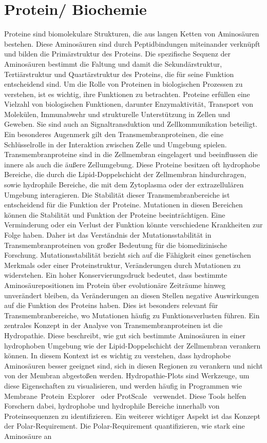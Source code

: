 \documentclass[german,version-2022-01]{uzl-thesis}
\begin{document}
\section{Protein/ Biochemie}
Proteine sind biomolekulare Strukturen, die aus langen Ketten von Aminos\"auren bestehen. Diese Aminos\"auren sind durch Peptidbindungen miteinander verkn\"upft und bilden die Prim\"arstruktur des Proteins. Die spezifische Sequenz der Aminos\"auren bestimmt die Faltung und damit die Sekund\"arstruktur, Terti\"arstruktur und Quart\"arstruktur des Proteins, die f\"ur seine Funktion entscheidend sind. Um die Rolle von Proteinen in biologischen Prozessen zu verstehen, ist es wichtig, ihre Funktionen zu betrachten. Proteine erf\"ullen eine Vielzahl von biologischen Funktionen, darunter Enzymaktivit\"at, Transport von Molek\"ulen, Immunabwehr und strukturelle Unterst\"utzung in Zellen und Geweben. Sie sind auch an Signaltransduktion und Zellkommunikation beteiligt. Ein besonderes Augenmerk gilt den Transmembranproteinen, die eine Schl\"usselrolle in der Interaktion zwischen Zelle und Umgebung spielen. Transmembranproteine sind in die Zellmembran eingelagert und beeinflussen die innere als auch die \"au\ss{}ere Zellumgebung. Diese Proteine besitzen oft hydrophobe Bereiche, die durch die Lipid-Doppelschicht der Zellmembran hindurchragen, sowie hydrophile Bereiche, die mit dem Zytoplasma oder der extrazellul\"aren Umgebung interagieren. Die Stabilit\"at dieser Transmembranbereiche ist entscheidend f\"ur die Funktion der Proteine. Mutationen in diesen Bereichen k\"onnen die Stabilit\"at und Funktion der Proteine beeintr\"achtigen. Eine Verminderung oder ein Verlust der Funktion k\"onnte verschiedene Krankheiten zur Folge haben. Daher ist das Verst\"andnis der Mutationsstabilit\"at in Transmembranproteinen von gro\ss{}er Bedeutung f\"ur die biomedizinische Forschung. Mutationsstabilit\"at bezieht sich auf die F\"ahigkeit eines genetischen Merkmals oder einer Proteinstruktur, Ver\"anderungen durch Mutationen zu widerstehen. Ein hoher Konservierungsdruck bedeutet, dass bestimmte Aminos\"aurepositionen im Protein \"uber evolution\"are Zeitr\"aume hinweg unver\"andert bleiben, da Ver\"anderungen an diesen Stellen negative Auswirkungen auf die Funktion des Proteins haben. Dies ist besonders relevant f\"ur Transmembranbereiche, wo Mutationen h\"aufig zu Funktionsverlusten f\"uhren. Ein zentrales Konzept in der Analyse von Transmembranproteinen ist die Hydropathie. Diese beschreibt, wie gut sich bestimmte Aminos\"auren in einer hydrophoben Umgebung wie der Lipid-Doppelschicht der Zellmembran verankern k\"onnen. In diesem Kontext ist es wichtig zu verstehen, dass hydrophobe Aminos\"auren besser geeignet sind, sich in diesen Regionen zu verankern und nicht von der Membran abgesto\ss{}en werden. Hydropathie-Plots sind Werkzeuge, um diese Eigenschaften zu visualisieren, und werden h\"aufig in Programmen wie Membrane~Protein~Explorer~\cite{membraneProteinExplorer} oder ProtScale~\cite{protScale} verwendet. Diese Tools helfen Forschern dabei, hydrophobe und hydrophile Bereiche innerhalb von Proteinsequenzen zu identifizieren. Ein weiterer wichtiger Aspekt ist das Konzept der Polar-Requirement. Die Polar-Requirement quantifizieren, wie stark eine Aminos\"aure an 
\end{document}
